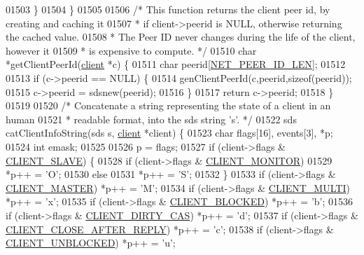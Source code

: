 \begin{DoxyCode}
{{{{{{{{{{{{{{{{{{01503     \}
01504 \}
01505 
01506 \textcolor{comment}{/* This function returns the client peer id, by creating and caching it}
01507 \textcolor{comment}{ * if client->peerid is NULL, otherwise returning the cached value.}
01508 \textcolor{comment}{ * The Peer ID never changes during the life of the client, however it}
01509 \textcolor{comment}{ * is expensive to compute. */}
01510 \textcolor{keywordtype}{char} *getClientPeerId(\hyperlink{structclient}{client} *c) \{
01511     \textcolor{keywordtype}{char} peerid[\hyperlink{server_8h_a39a30f77e23c1994e70b6c9bc892dee9}{NET\_PEER\_ID\_LEN}];
01512 
01513     \textcolor{keywordflow}{if} (c->peerid == NULL) \{
01514         genClientPeerId(c,peerid,\textcolor{keyword}{sizeof}(peerid));
01515         c->peerid = sdsnew(peerid);
01516     \}
01517     \textcolor{keywordflow}{return} c->peerid;
01518 \}
01519 
01520 \textcolor{comment}{/* Concatenate a string representing the state of a client in an human}
01521 \textcolor{comment}{ * readable format, into the sds string 's'. */}
01522 sds catClientInfoString(sds s, \hyperlink{structclient}{client} *client) \{
01523     \textcolor{keywordtype}{char} flags[16], events[3], *p;
01524     \textcolor{keywordtype}{int} emask;
01525 
01526     p = flags;
01527     \textcolor{keywordflow}{if} (client->flags & \hyperlink{server_8h_ae9f6995948253652bc9454d79a72f4a7}{CLIENT\_SLAVE}) \{
01528         \textcolor{keywordflow}{if} (client->flags & \hyperlink{server_8h_a7724350e4f0ddbf1c80740699fac78be}{CLIENT\_MONITOR})
01529             *p++ = \textcolor{stringliteral}{'O'};
01530         \textcolor{keywordflow}{else}
01531             *p++ = \textcolor{stringliteral}{'S'};
01532     \}
01533     \textcolor{keywordflow}{if} (client->flags & \hyperlink{server_8h_a3d8f0cc8d0653ee2b6dafb454292c069}{CLIENT\_MASTER}) *p++ = \textcolor{stringliteral}{'M'};
01534     \textcolor{keywordflow}{if} (client->flags & \hyperlink{server_8h_a7f61f783f429419f8c593291a509b03a}{CLIENT\_MULTI}) *p++ = \textcolor{stringliteral}{'x'};
01535     \textcolor{keywordflow}{if} (client->flags & \hyperlink{server_8h_a503ad979164a52f0f5e2a63e4c7da3a0}{CLIENT\_BLOCKED}) *p++ = \textcolor{stringliteral}{'b'};
01536     \textcolor{keywordflow}{if} (client->flags & \hyperlink{server_8h_a0f4df645d72b6b3e9a0d07afbe502a51}{CLIENT\_DIRTY\_CAS}) *p++ = \textcolor{stringliteral}{'d'};
01537     \textcolor{keywordflow}{if} (client->flags & \hyperlink{server_8h_a8cff2154afcc2e87ac85bdbbe2814091}{CLIENT\_CLOSE\_AFTER\_REPLY}) *p++ = \textcolor{stringliteral}{'c'};
01538     \textcolor{keywordflow}{if} (client->flags & \hyperlink{server_8h_a1252372d6834686c29e958d9d96367a8}{CLIENT\_UNBLOCKED}) *p++ = \textcolor{stringliteral}{'u'};
}}}}}}}}}}}}}}}}}}
\end{DoxyCode}
